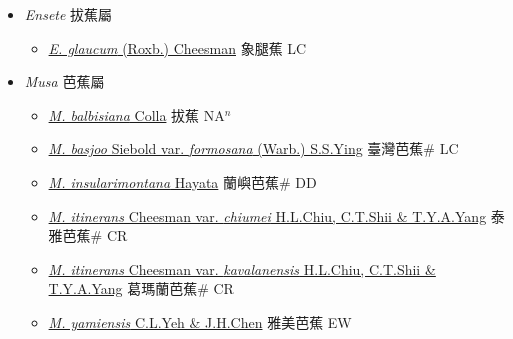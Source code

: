 
  \begin{itemize}
 \item[] \textit{Ensete} 拔蕉屬
                    
  \begin{itemize}
        \item[] \href{http://www.theplantlist.org/tpl1.1/search?q=Ensete+glaucum}{\textit{E. glaucum} (Roxb.) Cheesman}   象腿蕉 LC
  \end{itemize}
 \item[] \textit{Musa} 芭蕉屬
                    
  \begin{itemize}
        \item[] \href{http://www.theplantlist.org/tpl1.1/search?q=Musa+balbisiana}{\textit{M. balbisiana} Colla}   拔蕉 NA$^n$
        \item[] \href{http://www.theplantlist.org/tpl1.1/search?q=Musa+basjoo+var.+formosana}{\textit{M. basjoo} Siebold var. \textit{formosana} (Warb.) S.S.Ying}   臺灣芭蕉\# LC
        \item[] \href{http://www.theplantlist.org/tpl1.1/search?q=Musa+insularimontana}{\textit{M. insularimontana} Hayata}   蘭嶼芭蕉\# DD
        \item[] \href{http://www.theplantlist.org/tpl1.1/search?q=Musa+itinerans+var.+chiumei}{\textit{M. itinerans} Cheesman var. \textit{chiumei} H.L.Chiu, C.T.Shii \& T.Y.A.Yang}   泰雅芭蕉\# CR
        \item[] \href{http://www.theplantlist.org/tpl1.1/search?q=Musa+itinerans+var.+kavalanensis}{\textit{M. itinerans} Cheesman var. \textit{kavalanensis} H.L.Chiu, C.T.Shii \& T.Y.A.Yang}   葛瑪蘭芭蕉\# CR
        \item[] \href{http://www.theplantlist.org/tpl1.1/search?q=Musa+yamiensis}{\textit{M. yamiensis} C.L.Yeh \& J.H.Chen}   雅美芭蕉 EW
  \end{itemize}
  \end{itemize}
